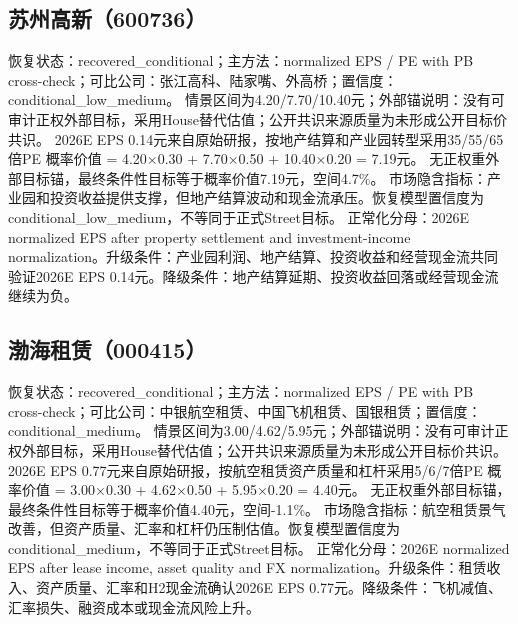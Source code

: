 \subsection{苏州高新（600736）}
恢复状态：recovered\_conditional；主方法：normalized EPS / PE with PB cross-check；可比公司：张江高科、陆家嘴、外高桥；置信度：conditional\_low\_medium。
情景区间为4.20/7.70/10.40元；外部锚说明：没有可审计正权外部目标，采用House替代估值；公开共识来源质量为未形成公开目标价共识。
2026E EPS 0.14元来自原始研报，按地产结算和产业园转型采用35/55/65倍PE
概率价值 = 4.20×0.30 + 7.70×0.50 + 10.40×0.20 = 7.19元。
无正权重外部目标锚，最终条件性目标等于概率价值7.19元，空间4.7\%。
市场隐含指标：产业园和投资收益提供支撑，但地产结算波动和现金流承压。恢复模型置信度为conditional\_low\_medium，不等同于正式Street目标。
正常化分母：2026E normalized EPS after property settlement and investment-income normalization。升级条件：产业园利润、地产结算、投资收益和经营现金流共同验证2026E EPS 0.14元。降级条件：地产结算延期、投资收益回落或经营现金流继续为负。
\subsection{渤海租赁（000415）}
恢复状态：recovered\_conditional；主方法：normalized EPS / PE with PB cross-check；可比公司：中银航空租赁、中国飞机租赁、国银租赁；置信度：conditional\_medium。
情景区间为3.00/4.62/5.95元；外部锚说明：没有可审计正权外部目标，采用House替代估值；公开共识来源质量为未形成公开目标价共识。
2026E EPS 0.77元来自原始研报，按航空租赁资产质量和杠杆采用5/6/7倍PE
概率价值 = 3.00×0.30 + 4.62×0.50 + 5.95×0.20 = 4.40元。
无正权重外部目标锚，最终条件性目标等于概率价值4.40元，空间-1.1\%。
市场隐含指标：航空租赁景气改善，但资产质量、汇率和杠杆仍压制估值。恢复模型置信度为conditional\_medium，不等同于正式Street目标。
正常化分母：2026E normalized EPS after lease income, asset quality and FX normalization。升级条件：租赁收入、资产质量、汇率和H2现金流确认2026E EPS 0.77元。降级条件：飞机减值、汇率损失、融资成本或现金流风险上升。
